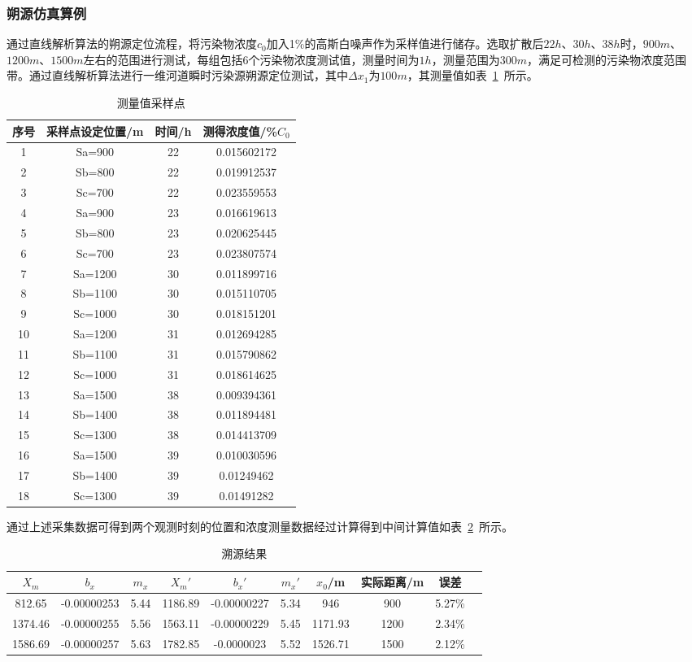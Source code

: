 \documentclass{whutmod}
\begin{document}
\subsubsection{朔源仿真算例}

通过直线解析算法的朔源定位流程，将污染物浓度$c_{0}$加入1\%的高斯白噪声作为采样值进行储存。选取扩散后$22h$、$30h$、$38h$时，$900m$、$1200m$、$1500m$左右的范围进行测试，每组包括6个污染物浓度测试值，测量时间为$1h$，测量范围为$300m$，满足可检测的污染物浓度范围带。通过直线解析算法进行一维河道瞬时污染源朔源定位测试，其中$\Delta x_{1}$为$100m$，其测量值如表~\ref{biao}~所示。
	\begin{table}[H]
	\caption{测量值采样点}\label{biao} \centering
	\begin{tabular}{cccc}
		\toprule[1.5pt]
		序号 &采样点设定位置/m&  时间/h & 测得浓度值/\%$C_{0}$ \\
		\midrule[1pt]
		1	& Sa=900 &22 &0.015602172\\
		2	& Sb=800 & 22 &0.019912537\\
		3	& Sc=700 &22 &0.023559553\\
		4	& Sa=900 &23 &0.016619613\\
		5	& Sb=800 &23 &0.020625445\\
		6	& Sc=700 &23&0.023807574\\
		7	& Sa=1200 &30 &0.011899716\\
		8	& Sb=1100 &30 &0.015110705\\
		9	& Sc=1000 &30 &0.018151201\\
		10	& Sa=1200 &31 &0.012694285\\
		11	& Sb=1100 &31 &0.015790862\\
		12	& Sc=1000 &31 &0.018614625\\
		13	& Sa=1500 &38 &0.009394361\\
		14	& Sb=1400 &38 &0.011894481\\
		15	& Sc=1300 &38 &0.014413709\\
		16	& Sa=1500 &39 &0.010030596\\
		17	& Sb=1400 &39 &0.01249462\\
		18	& Sc=1300 &39 &0.01491282\\
		\bottomrule[1.5pt]
	\end{tabular}
\end{table}

通过上述采集数据可得到两个观测时刻的位置和浓度测量数据经过计算得到中间计算值如表~\ref{biao2}~所示。
	\begin{table}[H]
	\caption{溯源结果}\label{biao2} \centering
	\begin{tabular}{cccccccccc}
		\toprule[1.5pt]
		$X_{m}$& $b_{x}$ & $m_{x}$ &${X_{m}}'$ & ${b_{x}}'$&${m_{x}}'$&$x_{0}$/m&实际距离/m& 误差\\
		\midrule[1pt]
		812.65 &-0.00000253 &5.44&1186.89&-0.00000227&5.34&946&900&5.27\%\\
		1374.46& -0.00000255 &5.56&1563.11&-0.00000229&5.45&1171.93&1200&2.34\%\\
		1586.69 &-0.00000257 &5.63&1782.85&-0.0000023&5.52&1526.71&1500&2.12\%\\
		\bottomrule[1.5pt]
	\end{tabular}
\end{table}
\end{document}
